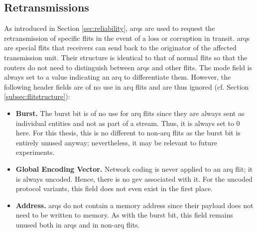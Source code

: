 \subsection{Retransmissions}\label{subsec:arqretransmissions}
As introduced in Section \ref{sec:reliability}, \glspl{arq} are used to request the retransmission of specific flits in the event of a loss or
corruption in transit. \Glspl{arq} are special flits that receivers can send back to the originator of the affected transmission unit. Their structure
is identical to that of normal flits so that the routers do not need to distinguish between \glspl{arq} and other flits. The mode field is always set
to a value indicating an \gls{arq} to differentiate them. However, the following header fields are of no use in \gls{arq} flits and are thus ignored
(cf. Section \ref{subsec:flitstructure}):
\begin{itemize}
    \item \textbf{Burst.} The burst bit is of no use for \gls{arq} flits since they are always sent as individual entities and not as part of a stream.
        Thus, it is always set to 0 here. For this thesis, this is no different to non-\gls{arq} flits as the burst bit is entirely unused anyway;
        nevertheless, it may be relevant to future experiments.
    \item \textbf{Global Encoding Vector.} Network coding is never applied to an \gls{arq} flit; it is always uncoded. Hence, there is no \gls{gev}
        associated with it. For the uncoded protocol variants, this field does not even exist in the first place.
    \item \textbf{Address.} \Glspl{arq} do not contain a memory address since their payload does not need to be written to memory. As with the burst
        bit, this field remains unused both in \glspl{arq} and in non-\gls{arq} flits.
\end{itemize}
\vspace{0.5\baselineskip}

